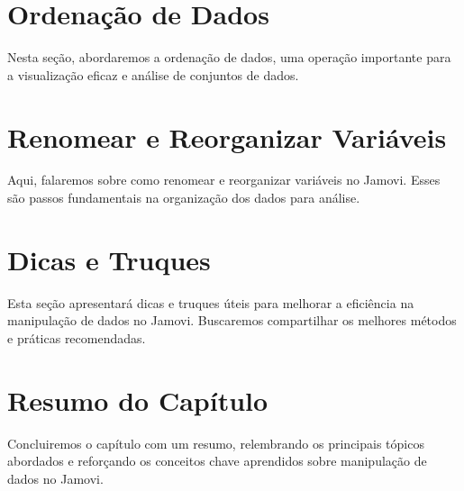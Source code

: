 \section{Ordenação de Dados}
Nesta seção, abordaremos a ordenação de dados, uma operação importante para a visualização eficaz e análise de conjuntos de dados.

\section{Renomear e Reorganizar Variáveis}
Aqui, falaremos sobre como renomear e reorganizar variáveis no Jamovi. Esses são passos fundamentais na organização dos dados para análise.

\section{Dicas e Truques}
Esta seção apresentará dicas e truques úteis para melhorar a eficiência na manipulação de dados no Jamovi. Buscaremos compartilhar os melhores métodos e práticas recomendadas.

\section{Resumo do Capítulo}
Concluiremos o capítulo com um resumo, relembrando os principais tópicos abordados e reforçando os conceitos chave aprendidos sobre manipulação de dados no Jamovi.
